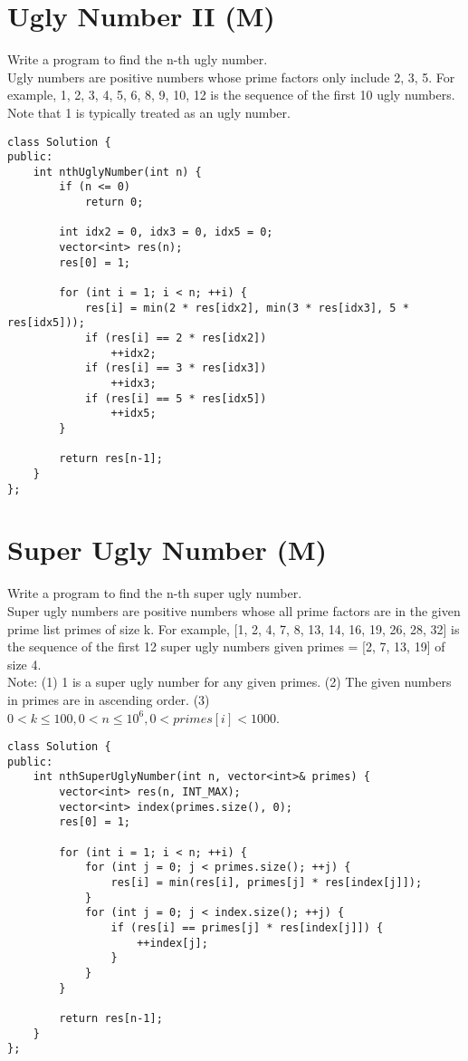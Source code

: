 \section{Ugly Number II (M)}
Write a program to find the n-th ugly number. \\

Ugly numbers are positive numbers whose prime factors only include 2, 3, 5. For example, 1, 2, 3, 4, 5, 6, 8, 9, 10, 12 is the sequence of the first 10 ugly numbers. \\

Note that 1 is typically treated as an ugly number. \\

\begin{lstlisting}
class Solution {
public:
    int nthUglyNumber(int n) {
        if (n <= 0)
            return 0;

        int idx2 = 0, idx3 = 0, idx5 = 0;
        vector<int> res(n);
        res[0] = 1;

        for (int i = 1; i < n; ++i) {
            res[i] = min(2 * res[idx2], min(3 * res[idx3], 5 * res[idx5]));
            if (res[i] == 2 * res[idx2])
                ++idx2;
            if (res[i] == 3 * res[idx3])
                ++idx3;
            if (res[i] == 5 * res[idx5])
                ++idx5;
        }
        
        return res[n-1];
    }
};
\end{lstlisting}


\section{Super Ugly Number (M)}
Write a program to find the n-th super ugly number.\\

Super ugly numbers are positive numbers whose all prime factors are in the given prime list primes of size k. For example, [1, 2, 4, 7, 8, 13, 14, 16, 19, 26, 28, 32] is the sequence of the first 12 super ugly numbers given primes = [2, 7, 13, 19] of size 4.\\

Note:
(1) 1 is a super ugly number for any given primes.
(2) The given numbers in primes are in ascending order.
(3) $0 < k \leq 100, 0 < n \leq 10^6, 0 < primes[i] < 1000$. \\

\begin{lstlisting}
class Solution {
public:
    int nthSuperUglyNumber(int n, vector<int>& primes) {
        vector<int> res(n, INT_MAX);
        vector<int> index(primes.size(), 0);
        res[0] = 1;
        
        for (int i = 1; i < n; ++i) {
            for (int j = 0; j < primes.size(); ++j) {
                res[i] = min(res[i], primes[j] * res[index[j]]);
            }
            for (int j = 0; j < index.size(); ++j) {
                if (res[i] == primes[j] * res[index[j]]) {
                    ++index[j];
                }
            }
        }
        
        return res[n-1];
    }
};
\end{lstlisting}


